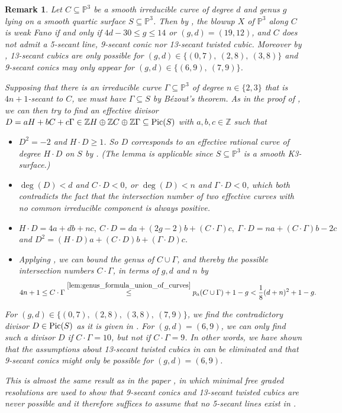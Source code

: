 \documentclass[english,11pt,reqno]{amsart}
\newcommand{\sub}{\subseteq}
\newcommand{\Pthree}{\mathbb{P}^3}
\newcommand{\Z}{\mathbb{Z}}
\newcommand{\Pic}{\textup{Pic}}
\newtheorem{rmk}[thm]{Remark}
\begin{document}
\begin{rmk}
	Let $C\sub \Pthree$ be a smooth irreducible curve of degree $d$ and genus $g$ lying on a smooth quartic surface $S\sub \Pthree$. Then by \cite{Blanc_Lamy_Weak_Fano_threefolds}, the blowup $X$ of $\Pthree$ along $C$ is weak Fano if and only if $4d-30\leq g\leq 14$ or $(g,d)=(19,12)$, and $C$ does not admit a 5-secant line, 9-secant conic nor 13-secant twisted cubic. Moreover by \cite[Prop.\ 5.8]{Blanc_Lamy_Weak_Fano_threefolds}, 13-secant cubics are only possible for $(g,d)\in \{(0,7),\:(2,8),\:(3,8)\}$ and 9-secant conics may only appear for $(g,d)\in\{(6,9),\:(7,9)\}$. \par 
	Supposing that there is an irreducible curve $\Gamma \sub \Pthree$ of degree $n\in \{2,3\}$ that is $4n+1$-secant to $C$, we must have $\Gamma \sub S$ by Bézout's theorem. As in the proof of , we can then try to find an effective divisor $D=aH+bC+c\Gamma\in \Z H \oplus \Z C \oplus \Z \Gamma \sub \Pic(S)$ with $a,b,c\in\Z$ such that 
	\begin{itemize}
		\item $D^2=-2$ and $H\cdot D \geq 1$. So $D$ corresponds to an effective rational curve of degree $H\cdot D$ on $S$ by . (The lemma is applicable since $S\sub \Pthree$ is a smooth K3-surface.) 
		\item $\deg(D)<d$ and $C\cdot D <0$, or $\deg(D)<n$ and $\Gamma \cdot D<0$, which both contradicts the fact that the intersection number of two effective curves with no common irreducible component is always positive.
		\item $H\cdot D = 4a+db+nc,\: C\cdot D =da+ (2g-2)b+ (C\cdot \Gamma)c, \: \Gamma \cdot D = na + (C\cdot \Gamma)b-2c$ and $D^2 = (H\cdot D)a + (C\cdot D)b+ (\Gamma \cdot D)c$.
		\item Applying \cite[Prop.\ 2.6]{Blanc_Lamy_Weak_Fano_threefolds}, we can bound the genus of $C\cup \Gamma$, and thereby the possible intersection numbers $C\cdot \Gamma$, in terms of $g,d$ and $n$ by
		$$ 4n+1 \leq C\cdot \Gamma \overset{\ref{lem:genus_formula_union_of_curves}}{\leq} p_a(C\cup\Gamma)+1-g < \frac{1}{8}(d+n)^2+1-g.$$
	\end{itemize}
	For $(g,d)\in\{(0,7),\:(2,8),\:(3,8),\:(7,9)\}$, we find the contradictory divisor $D\in\Pic(S)$ as it is given in . For $(g,d)=(6,9)$, we can only find such a divisor $D$ if $C\cdot \Gamma= 10$, but not if $C\cdot \Gamma =9$.	In other words, we have shown that the assumptions about 13-secant twisted cubics in \cite{Blanc_Lamy_Weak_Fano_threefolds} can be eliminated and that 9-secant conics might only be possible for $(g,d)=(6,9)$. \par 
	This is almost the same result as in the paper \cite{Jean_Dalmeida}, in which minimal free graded resolutions are used to show that 9-secant conics and 13-secant twisted cubics are never possible and it therefore suffices to assume that no 5-secant lines exist in \cite{Blanc_Lamy_Weak_Fano_threefolds}.
\end{rmk}
\end{document}
